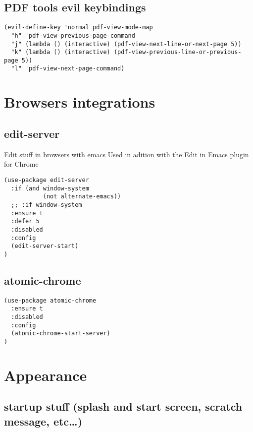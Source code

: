 \documentclass[11pt]{article}
\begin{document}
\subsection*{PDF tools evil keybindings}
\label{sec:org0c559a9}
\begin{verbatim}
(evil-define-key 'normal pdf-view-mode-map
  "h" 'pdf-view-previous-page-command
  "j" (lambda () (interactive) (pdf-view-next-line-or-next-page 5))
  "k" (lambda () (interactive) (pdf-view-previous-line-or-previous-page 5))
  "l" 'pdf-view-next-page-command)
\end{verbatim}



\section*{Browsers integrations}
\label{sec:orga03591f}

\subsection*{edit-server}
\label{sec:org1cf89ef}

Edit stuff in browsers with emacs
Used in adition with the Edit in Emacs plugin for Chrome
\begin{verbatim}
(use-package edit-server
  :if (and window-system
           (not alternate-emacs))
  ;; :if window-system
  :ensure t
  :defer 5
  :disabled
  :config
  (edit-server-start)
)
\end{verbatim}

\subsection*{atomic-chrome}
\label{sec:org2631ac8}

\begin{verbatim}
(use-package atomic-chrome
  :ensure t
  :disabled
  :config
  (atomic-chrome-start-server)
)
\end{verbatim}


\section*{Appearance}
\label{sec:orgd4dcdf9}


\subsection*{startup stuff (splash and start screen, scratch message, etc\ldots{})}
\label{sec:org2d2ca91}
\end{document}
